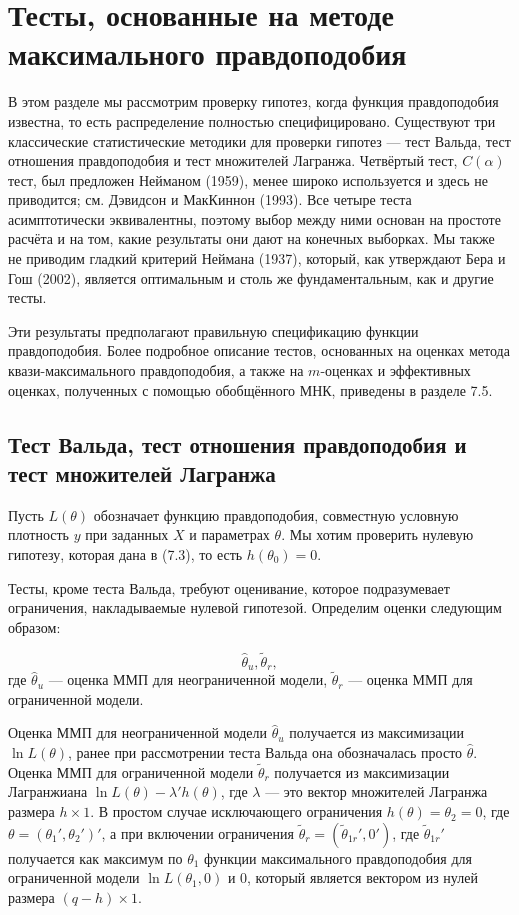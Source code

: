 \section{Тесты, основанные на методе максимального правдоподобия}

В этом разделе мы рассмотрим проверку гипотез, когда функция правдоподобия известна, то есть распределение полностью специфицировано. Существуют три классические статистические методики для проверки гипотез --- тест Вальда, тест отношения правдоподобия и тест множителей Лагранжа. Четвёртый тест, $C(\alpha)$ тест, был предложен Нейманом (1959), менее широко используется и здесь не приводится; см. Дэвидсон и МакКиннон (1993). Все четыре теста асимптотически эквивалентны, поэтому выбор между ними основан на простоте расчёта и на том, какие результаты они дают на конечных выборках. Мы также не приводим гладкий критерий Неймана (1937), который, как утверждают Бера и Гош (2002), является оптимальным и столь же фундаментальным, как и другие тесты.

Эти результаты предполагают правильную спецификацию функции правдоподобия. Более подробное описание тестов, основанных на оценках метода квази-максимального правдоподобия, а также на $m$-оценках и эффективных оценках, полученных с помощью обобщённого МНК, приведены в разделе 7.5.

\subsection{Тест Вальда, тест отношения правдоподобия и тест множителей Лагранжа}

Пусть $L(\theta)$ обозначает функцию правдоподобия, совместную условную плотность $y$ при заданных $X$ и параметрах $\theta$. Мы хотим проверить нулевую гипотезу, которая дана в (7.3), то есть  $h(\theta_0) = 0$.

Тесты, кроме теста Вальда, требуют оценивание, которое подразумевает ограничения, накладываемые нулевой гипотезой. Определим оценки следующим образом:

\begin{equation}
\hat{\theta}_u,
\tilde{\theta}_r,
\end{equation}
где $\hat{\theta}_u$ --- оценка ММП для неограниченной модели, $\tilde{\theta}_r$ --- оценка ММП для ограниченной модели.

Оценка ММП для неограниченной модели $\hat{\theta}_u$ получается из максимизации $\ln L(\theta)$, ранее при рассмотрении теста Вальда она обозначалась просто $\hat{\theta}$. Оценка ММП для ограниченной модели $\tilde{\theta}_r$ получается из максимизации Лагранжиана $\ln L(\theta) - \lambda'h(\theta)$, где $\lambda$ --- это вектор множителей Лагранжа размера $h \times 1$. В простом случае исключающего ограничения $h(\theta) = \theta_2 = 0$, где $\theta = (\theta_1', \theta_2')'$, а при включении ограничения $\tilde{\theta}_r = (\tilde{\theta}_{1r}',0')$, где $\tilde{\theta}_{1r}'$ получается как максимум по $\theta_1$ функции максимального правдоподобия для ограниченной модели $\ln L(\theta_1, 0)$ и $0$, который является вектором из нулей размера $(q - h) \times 1$.


